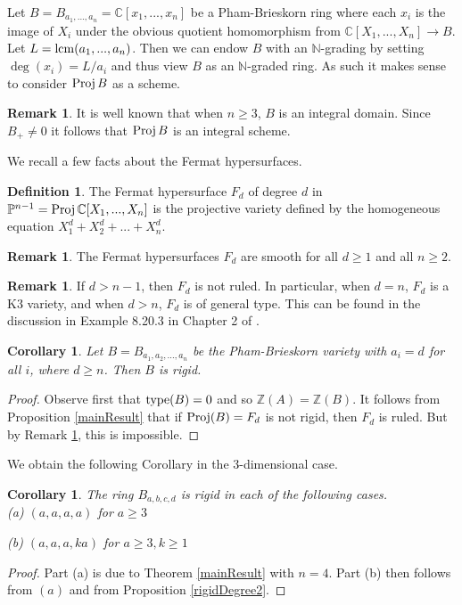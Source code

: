 \documentclass[12pt]{amsart}
\theoremstyle{plain}
\newtheorem{corollary}[subsection]{Corollary}
\theoremstyle{definition}
\newtheorem{definition}[subsection]{Definition}
\newtheorem{remark}[subsection]{Remark}
\newcommand{\Proj}{		\operatorname{{\rm Proj}}}
\newcommand{\lcm}{		\operatorname{{\rm lcm}}}
\newcommand{\type}{		\operatorname{{\rm type}}}
\newcommand{\Integ}{\ensuremath{\mathbb{Z}}}
\newcommand{\Nat}{\ensuremath{\mathbb{N}}}
\newcommand{\Comp}{\ensuremath{\mathbb{C}}}
\newcommand{\proj}{\ensuremath{\mathbb{P}}}
\begin{document}
Let $B = B_{a_1, ..., a_n} = \Comp[x_1, ..., x_n]$ be a Pham-Brieskorn ring where each $x_i$ is the image of $X_i$ under the obvious quotient homomorphism from $\Comp[X_1,...,X_n] \to B$. Let $L = \lcm(a_1, ..., a_n)$. Then we can endow $B$ with an $\Nat$-grading by setting $\deg(x_i) = L/a_i$ and thus view $B$ as an $\Nat$-graded ring. As such it makes sense to consider $\Proj B$ as a scheme. 

\begin{remark} It is well known that when $n \geq 3$, $B$ is an integral domain. Since $B_+ \neq 0$ it follows that $\Proj B$ is an integral scheme.
\end{remark}

We recall a few facts about the Fermat hypersurfaces. 

\begin{definition} The Fermat hypersurface $F_d$ of degree $d$ in $\proj^{n-1} = \Proj \Comp[X_1, ..., X_n]$ is the projective variety defined by the homogeneous equation $X_1^d + X_2^d + ... + X_n^d$.  
\end{definition}

\begin{remark} The Fermat hypersurfaces $F_d$ are smooth for all $d \geq 1$ and all $n \geq 2$. 
\end{remark}
\begin{remark} \label{notRuled}
	If $d > n-1$, then $F_d$ is not ruled. In particular, when $d=n$, $F_d$ is a K3 variety, and when $d > n$, $F_d$ is of general type. This can be found in the discussion in Example 8.20.3 in Chapter 2 of \cite{Hartshorne}. 
\end{remark}	

\begin{corollary} Let $B = B_{a_1,a_2,...,a_n}$ be the Pham-Brieskorn variety with $a_i = d$ for all $i$, where $d \geq n$. Then $B$ is rigid. 
\end{corollary}

\begin{proof} Observe first that $\type(B) = 0$ and so $\Integ(A) = \Integ(B)$. It follows from Proposition \ref{mainResult} that if $\Proj(B) = F_d$ is not rigid, then $F_d$ is ruled. But by Remark \ref{notRuled}, this is impossible. 
\end{proof}

We obtain the following Corollary in the 3-dimensional case. 

\begin{corollary}
	The ring $B_{a,b,c,d}$ is rigid in each of the following cases.
	\\
	
	(a) $(a,a,a,a)$ for $a \geq 3$
	
	(b) $(a,a,a,ka)$ for $a \geq 3, k \geq 1$
\end{corollary}
\begin{proof}
	Part (a) is due to Theorem \ref{mainResult} with $n = 4$. Part (b) then follows from $(a)$ and from Proposition \ref{rigidDegree2}. 
\end{proof}
\end{document}

